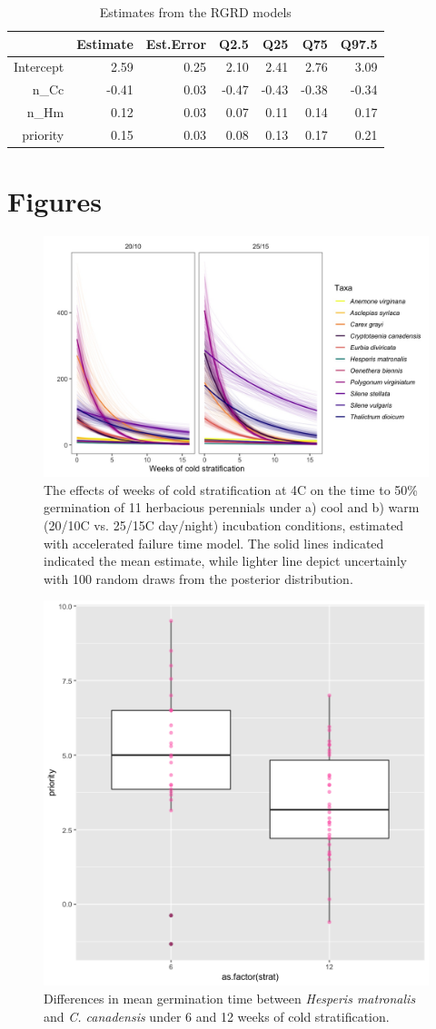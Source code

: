 \documentclass{article}
\begin{document}
\begin{table}[ht]
\centering
\begin{tabular}{rrrrrrr}
  \hline
 & Estimate & Est.Error & Q2.5 & Q25 & Q75 & Q97.5 \\ 
  \hline
Intercept & 2.59 & 0.25 & 2.10 & 2.41 & 2.76 & 3.09 \\ 
  n\_Cc & -0.41 & 0.03 & -0.47 & -0.43 & -0.38 & -0.34 \\ 
  n\_Hm & 0.12 & 0.03 & 0.07 & 0.11 & 0.14 & 0.17 \\ 
  priority & 0.15 & 0.03 & 0.08 & 0.13 & 0.17 & 0.21 \\ 
   \hline
\end{tabular}
\caption{Estimates from the RGRD models}
\label{tab:RGRD}
\end{table}

\pagebreak


\section*{Figures}
\begin{figure}[h!]
    \centering
\includegraphics[width=\textwidth]{..//figure/AFTall.jpeg}
   \caption{The effects of weeks of cold stratification at 4\degree C on the time to 50\% germination of 11 herbacious perennials under a) cool and b) warm (20/10\degree C vs. 25/15\degree C day/night) incubation conditions, estimated with accelerated failure time model. The solid lines indicated indicated the mean estimate, while lighter line depict uncertainly with 100 random draws from the posterior distribution.} 
   \label{fig:AFTall}
\end{figure}


\begin{figure}[h!]
    \centering
\includegraphics[width=.5\textwidth]{..//figure/priority_treat.png}
   \caption{Differences in mean germination time between \textit{Hesperis matronalis} and \textit{C. canadensis} under 6 and 12 weeks of cold stratification.} 
   \label{fig:MGTsup}
\end{figure}
\end{document}
